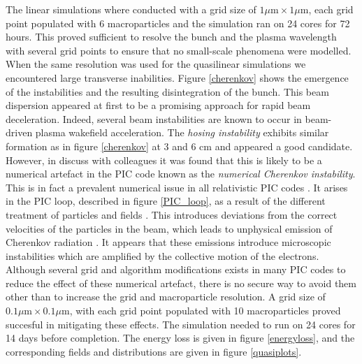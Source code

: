 \indent The linear simulations where conducted with a grid size of $1 \mu\text{m}\times 1\mu\text{m}$, each grid point populated with 6 macroparticles and the simulation ran on 24 cores for 72 hours. This proved sufficient to resolve the bunch and the plasma wavelength with several grid points to ensure that no small-scale phenomena were modelled.  When the same resolution was used for the quasilinear simulations we encountered large transverse inabilities. Figure \ref{cherenkov} shows the emergence of the instabilities and the resulting disintegration of the bunch. This beam dispersion appeared at first to be a promising approach for rapid beam deceleration. Indeed, several beam instabilities are known to occur in beam-driven plasma wakefield acceleration. The \textit{hosing instability} \cite{Huang2007} exhibits similar formation as in figure \ref{cherenkov} at 3 and 6 cm and appeared a good candidate. However, in discuss with colleagues it was found that this is likely to be a numerical artefact in the PIC code known as the \textit{numerical Cherenkov instability}. This is in fact a prevalent numerical issue in all relativistic PIC codes \cite{Godfrey2018}. It arises in the PIC loop, described in figure \ref{PIC_loop}, as a result of the different treatment of particles and fields  \cite{Blinne}. This introduces deviations from the correct velocities of the particles in the beam, which  leads to unphysical emission of Cherenkov radiation \cite{Godfrey2018}. It appears that these emissions introduce microscopic instabilities which are amplified by the collective motion of the electrons. Although several grid and algorithm modifications exists in many PIC codes to reduce the effect of these numerical artefact, there is no secure way to avoid them other than to increase the grid and macroparticle resolution. A grid size of $0.1 \mu\text{m}\times 0.1\mu\text{m}$, with each grid point populated with 10 macroparticles proved succesful in mitigating these effects. The simulation needed to run on 24 cores for 14 days before completion. The energy loss is given in figure \ref{energyloss}, and the corresponding fields and distributions are given in figure \ref{quasiplots}.


